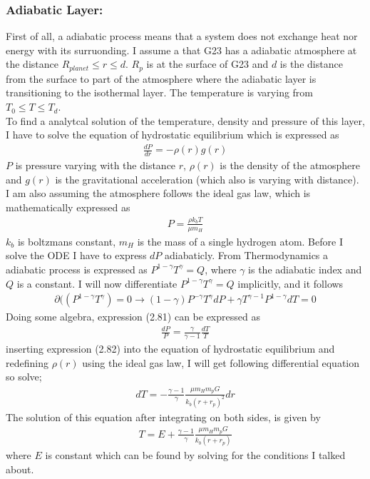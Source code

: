 \documentclass[a4paper,11pt,english]{report}
\begin{document}
\subsubsection{Adiabatic Layer:} First of all, a adiabatic process means that a
system does not exchange heat nor energy with its surruonding. I assume a that
G23 has a adiabatic atmosphere at the distance \(R_{planet} \le r \le d\).
\(R_{p}\) is at the surface of G23 and \(d\) is the distance from the surface
to part of the atmosphere where the adiabatic layer is transitioning to the
isothermal layer. The temperature is varying from \(T_{0} \le T \le T_{d}\).
\vspace{3mm}
\\
To find a analytcal solution of the temperature, density and pressure of this
layer, I have to solve the equation of hydrostatic equilibrium which is
expressed as
\begin{align}
  \frac{dP}{dr} = -\rho (r)g(r)
\end{align}
\(P\) is pressure varying with the distance \(r\), \(\rho (r)\) is the density
of the atmosphere and \(g(r)\) is the gravitational acceleration (which also is
varying with distance). I am also assuming the atmosphere follows the ideal gas
law, which is mathematically expressed as
\begin{align}
  P = \frac{\rho k_{b}T}{\mu m_{H}}
\end{align}
\(k_{b}\) is boltzmans constant, \(m_{H}\) is the mass of a single hydrogen
atom. Before I solve the ODE I have to express \(dP\)
adiabaticly. From Thermodynamics a adiabatic process is expressed as
\(P^{1-\gamma}T^{\gamma} = Q\), where \(\gamma\) is the adiabatic index and
\(Q\) is a constant.
I will now differentiate \(P^{1-\gamma}T^{\gamma} = Q\) implicitly, and it follows
\begin{align}
  \partial{((P^{1-\gamma}T^{\gamma})} = 0 \to (1-\gamma)P^{-\gamma}T^{\gamma}dP
  + \gamma T^{\gamma-1}P^{1-\gamma}dT = 0
\end{align}
Doing some algebra, expression (2.81) can be expressed as
\begin{align}
  \frac{dP}{P} = \frac{\gamma}{\gamma-1}\frac{dT}{T}
\end{align}
inserting expression (2.82) into the equation of hydrostatic equilibrium and
redefining \(\rho (r)\) using the ideal gas law, I will get following
differential equation so solve;
\begin{align}
  dT  = -\frac{\gamma -1}{\gamma}\frac{\mu m_{H}m_{p}G}{k_{b}(r + r_{p})^{2}}dr 
\end{align}
The solution of this equation after integrating on both sides, is given by
\begin{align}
  T = E + \frac{\gamma -1}{\gamma}\frac{\mu m_{H}m_{p}G}{k_{b}(r + r_{p})}
\end{align}
where \(E\) is constant which can be found by solving for the conditions I
talked about.
\end{document}
